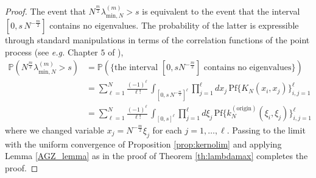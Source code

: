\documentclass[11pt,reqno]{amsproc}
\numberwithin{equation}{section}
\numberwithin{theorem}{section}
\begin{document}
\begin{proof}
The event that $N^{\frac{m}{2}}\lambda^{(m)}_{\mathrm{min},N} > s$ is equivalent to the event that the interval $[0,s\,N^{-\frac{m}{2}}]$ contains no eigenvalues. The probability of the latter is expressible through standard manipulations in terms of the correlation functions of the point process (see \textit{e.g.} Chapter $5$ of \cite{DVJ88}),
\begin{align}
\mathbb{P}\left(N^{\frac{m}{2}}\lambda^{(m)}_{\mathrm{min},N} > s\right) &= \mathbb{P}\left(\{\textrm{the interval}\,\, [0,sN^{-\frac{m}{2}}] \,\,\textrm{contains no eigenvalues}\}\right)\\
&= \sum_{\ell=1}^{N}\frac{(-1)^{\ell}}{\ell!}\,\int_{[0,s\,N^{-\frac{m}{2}}]^{\ell}}\prod_{j=1}^{\ell}dx_{j}\,\mathrm{Pf}\bigg\{K_{N}(x_{i},x_{j})\bigg\}_{i,j=1}^{\ell}\\
&= \sum_{\ell=1}^{N}\frac{(-1)^{\ell}}{\ell!}\,\int_{[0,s]^{\ell}}\prod_{j=1}^{\ell}d\xi_{j}\,\mathrm{Pf}\bigg\{k^{(\mathrm{origin})}_{N}(\xi_{i},\xi_{j})\bigg\}_{i,j=1}^{\ell}
\end{align}
where we changed variable $x_{j} = N^{-\frac{m}{2}}\xi_{j}$ for each $j=1,\ldots,\ell$. Passing to the limit with the uniform convergence of Proposition \ref{prop:kernolim} and applying Lemma \ref{AGZ_lemma} as in the proof of Theorem \ref{th:lambdamax} completes the proof.
\end{proof}
\end{document}
